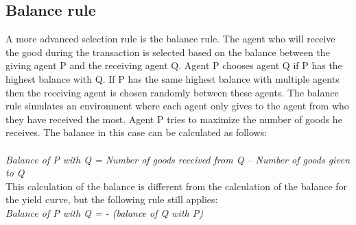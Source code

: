 \documentclass[twoside,openright]{uva-bachelor-thesis}
\begin{document}
\subsection{Balance rule}
A more advanced selection rule is the balance rule. The agent who will receive the good during the transaction is selected based on the balance between the giving agent P and the receiving agent Q. Agent P chooses agent Q if P has the highest balance with Q. If P has the same highest balance with multiple agents then the receiving agent is chosen randomly between these agents. The balance rule simulates an environment where each agent only gives to the agent from who they have received the most. Agent P tries to maximize the number of goods he receives. The balance in this case can be calculated as follows: 
\\
\\
\textit{Balance of P with Q = Number of goods received from Q – Number of goods given to Q} \\
This calculation of the balance is different from the calculation of the balance for the yield curve, but the following rule still applies:\\
\textit{Balance of P with Q = - (balance of Q with P)}
\end{document}
